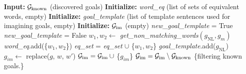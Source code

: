 \begin{minipage}{.6\textwidth} %
        \vspace{0.5cm}
        \begin{algorithmic}[1]
            \STATE \textbf{Input:} $\mathcal{G}_\text{known}$ (discovered goals)
            \STATE \textbf{Initialize:} \textit{word\_eq} (list of sets of equivalent words, empty) 
            \STATE \textbf{Initialize:} \textit{goal\_template} (list of template sentences used for imagining goals, empty)
            \STATE \textbf{Initialize:} $\mathcal{G}_\text{im}$ (empty)
                \STATE \textit{new\_goal\_template} = True
                        \STATE \textit{new\_goal\_template} = False
                            \STATE $w_1, w_2 \gets $ \textit{get\_non\_matching\_words$(g_\text{NL}, g_m)$}
                                 \STATE \textit{word\_eq}.add(\{$w_1,w_2$\})
                            \ELSE
                                        \STATE \textit{eq\_set} = \textit{eq\_set} $\cup$ \{$w_1,w_2$\}
                                    \ENDIF
                                \ENDFOR
                            \ENDIF
                        \ENDIF
                    \ENDIF
                \ENDFOR
                    \STATE \textit{goal\_template}.add($g_\text{NL}$)
                \ENDIF
            \ENDFOR
                                \STATE $g_{im} \gets$ replace($g$, $w$, $w'$)
                                    \STATE $\mathcal{G}_\text{im} = \mathcal{G}_\text{im} \: \cup $ \{$g_{im}$\}
                                \ENDIF
                            \ENDFOR
                        \ENDIF
                    \ENDFOR
                \ENDFOR
            \ENDFOR
            \STATE $\mathcal{G}_\text{im} = \mathcal{G}_\text{im} \setminus \mathcal{G}_\text{known}$ \hspace{1cm}\{filtering known goals.\}
        \end{algorithmic}
\end{minipage} %
